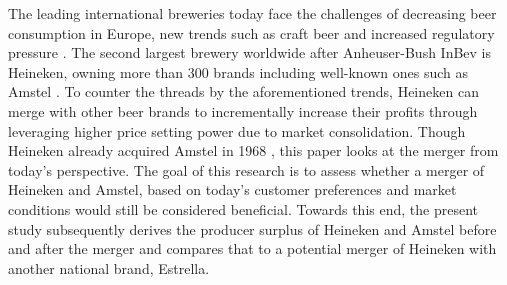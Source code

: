 \documentclass[12pt,a4paper]{article}
\begin{document}
The leading international breweries today face the challenges of decreasing beer consumption in Europe, new trends such as craft beer and increased regulatory pressure \citep{jpmorganWhatTapGlobal2018}.
The second largest brewery worldwide after Anheuser-Bush InBev is Heineken, owning more than 300 brands including well-known ones such as Amstel \citep{heinekenHeinekenAnnualReport2019}.
To counter the threads by the aforementioned trends, Heineken can merge with other beer brands to incrementally increase their profits through leveraging higher price setting power due to market consolidation.
Though Heineken already acquired Amstel in 1968 \citep[p. 49]{oliverOxfordCompanionBeer2011}, this paper looks at the merger from today's perspective.
The goal of this research is to assess whether a merger of Heineken and Amstel, based on today's customer preferences and market conditions would still be considered beneficial.
Towards this end, the present study subsequently derives the producer surplus of Heineken and Amstel before and after the merger and compares that to a potential merger of Heineken with another national brand, Estrella.
\end{document}
